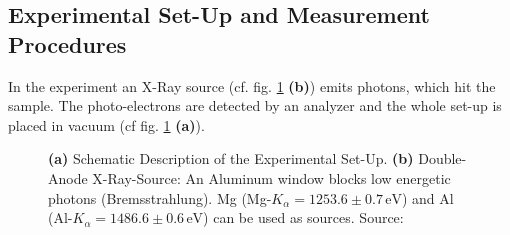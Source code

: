 \documentclass[a4paper]{scrartcl}
\numberwithin{equation}{section}
\numberwithin{figure}{section}
\numberwithin{table}{section}
\begin{document}
\clearpage


\subsection{Experimental Set-Up and Measurement Procedures}

In the experiment an X-Ray source (cf. fig. \ref{fig:setup} \textbf{(b)}) emits photons, which hit the sample. The photo-electrons are detected by an analyzer and the whole set-up is placed in vacuum (cf fig. \ref{fig:setup} \textbf{(a)}).


\begin{figure} 
 \centering
 \hfill

\caption{ \small \textbf{(a)} Schematic Description of the Experimental Set-Up. \textbf{(b)} Double-Anode X-Ray-Source: An Aluminum window blocks low energetic photons (Bremsstrahlung). Mg (Mg-$K_\alpha=1253.6\pm 0.7\,\text{eV}$) and Al (Al-$K_\alpha=1486.6\pm 0.6\,\text{eV}$)  can be used as sources. Source: \cite{script} } 
	\label{fig:setup}
\end{figure}

\FloatBarrier
\end{document}
